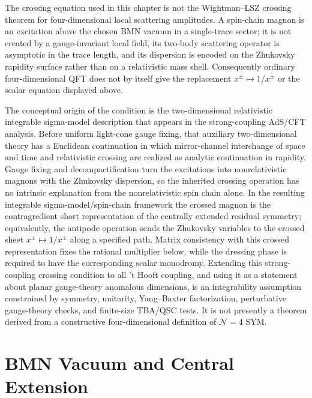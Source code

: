 \begin{warning}
\label{warn:planar-n4-magnon-crossing-status}
The crossing equation used in this chapter is not the Wightman--LSZ crossing
theorem for four-dimensional local scattering amplitudes.  A spin-chain
magnon is an excitation above the chosen BMN vacuum in a single-trace sector;
it is not created by a gauge-invariant local field, its two-body scattering
operator is asymptotic in the trace length, and its dispersion is encoded on
the Zhukovsky rapidity surface rather than on a relativistic mass shell.
Consequently ordinary four-dimensional QFT does not by itself give the
replacement \(x^\pm\mapsto1/x^\pm\) or the scalar equation displayed above.

The conceptual origin of the condition is the two-dimensional relativistic
integrable sigma-model description that appears in the strong-coupling
AdS/CFT analysis.  Before uniform light-cone gauge fixing, that auxiliary
two-dimensional theory has a Euclidean continuation in which mirror-channel
interchange of space and time and relativistic crossing are realized as
analytic continuation in rapidity.  Gauge fixing and decompactification turn
the excitations into nonrelativistic magnons with the Zhukovsky dispersion,
so the inherited crossing operation has no intrinsic explanation from the
nonrelativistic spin chain alone.  In the resulting integrable
sigma-model/spin-chain framework the crossed magnon is the contragredient
short representation of the centrally extended residual symmetry;
equivalently, the antipode operation sends the Zhukovsky variables to the
crossed sheet \(x^\pm\mapsto1/x^\pm\) along a specified path.  Matrix
consistency with this crossed representation fixes the rational multiplier
below, while the dressing phase is required to have the corresponding scalar
monodromy.  Extending this strong-coupling crossing condition to all 't Hooft
coupling, and using it as a statement about planar gauge-theory anomalous
dimensions, is an integrability assumption constrained by symmetry,
unitarity, Yang--Baxter factorization, perturbative gauge-theory checks, and
finite-size TBA/QSC tests.  It is not presently a theorem derived from a
constructive four-dimensional definition of \(\mathcal N=4\) SYM.
\end{warning}

\section{BMN Vacuum and Central Extension}

